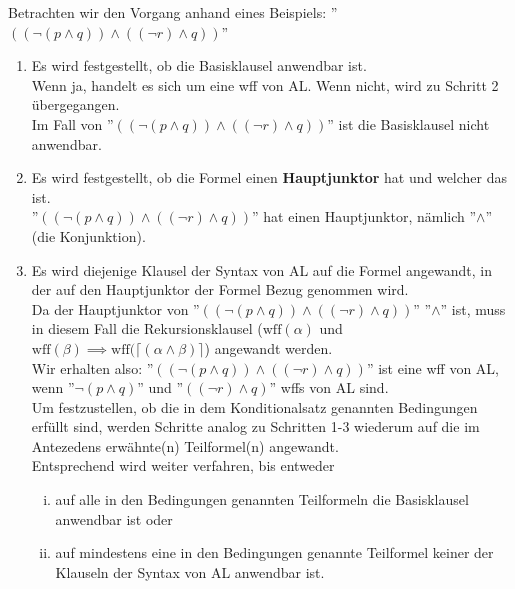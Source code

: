 \documentclass{scrartcl}
\begin{document}
Betrachten wir den Vorgang anhand eines Beispiels: ''$ ((\neg (p \wedge q)) \wedge ((\neg r) \wedge q)) $''

\begin{enumerate}
	\item Es wird festgestellt, ob die Basisklausel anwendbar ist. \\
	Wenn ja, handelt es sich um eine wff von AL. Wenn nicht, wird zu Schritt 2 übergegangen. \\
	Im Fall von ''$ ((\neg (p \wedge q)) \wedge ((\neg r) \wedge q)) $'' ist die Basisklausel nicht anwendbar.
	\item Es wird festgestellt, ob die Formel einen \textbf{Hauptjunktor} hat und welcher das ist. \\
	''$ ((\neg (p \wedge q)) \wedge ((\neg r) \wedge q)) $'' hat einen Hauptjunktor, nämlich ''$ \wedge $'' (die Konjunktion).
	\item Es wird diejenige Klausel der Syntax von AL auf die Formel angewandt, in der auf den Hauptjunktor der Formel Bezug genommen wird. \\
	
	Da der Hauptjunktor von ''$ ((\neg (p \wedge q)) \wedge ((\neg r) \wedge q)) $'' ''$ \wedge $'' ist, muss in diesem Fall die Rekursionsklausel ($ \text{wff}(\alpha) $ und $ \text{wff}(\beta) \implies \text{wff}(\lceil (\alpha \wedge \beta) \rceil $) angewandt werden. \\
	
	Wir erhalten also: ''$ ((\neg (p \wedge q)) \wedge ((\neg r) \wedge q)) $'' ist eine wff von AL, wenn ''$ \neg (p \wedge q) $'' und ''$ ((\neg r) \wedge q) $'' wffs von AL sind. \\
	
	Um festzustellen, ob die in dem Konditionalsatz genannten Bedingungen erfüllt sind, werden Schritte analog zu Schritten 1-3 wiederum auf die im Antezedens erwähnte(n) Teilformel(n) angewandt. \\
	
	Entsprechend wird weiter verfahren, bis entweder
	\begin{enumerate}[(i)]
		\item auf alle in den Bedingungen genannten Teilformeln die Basisklausel anwendbar ist oder
		\item auf mindestens eine in den Bedingungen genannte Teilformel keiner der Klauseln der Syntax von AL anwendbar ist.
	\end{enumerate} 
	

\end{enumerate}
\end{document}
